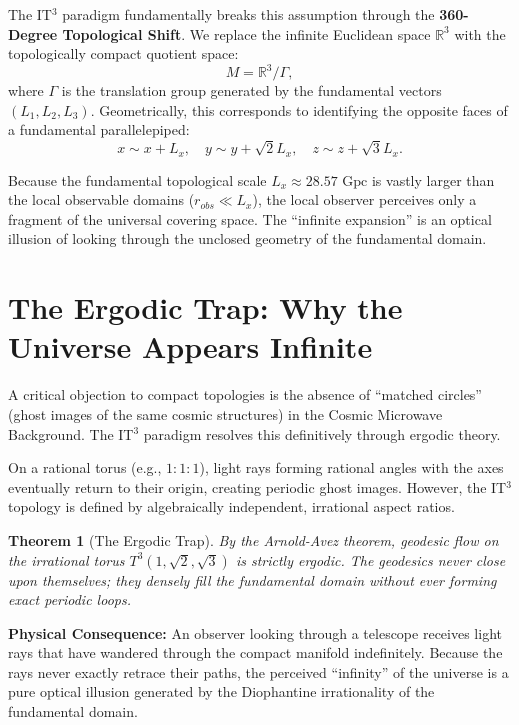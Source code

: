 \documentclass[12pt, a4paper]{article}
\newtheorem{theorem}{Theorem}
\begin{document}
The IT$^3$ paradigm fundamentally breaks this assumption through the \textbf{360-Degree Topological Shift}. We replace the infinite Euclidean space $\mathbb{R}^3$ with the topologically compact quotient space:
\begin{equation}
M = \mathbb{R}^3 / \Gamma,
\end{equation}
where $\Gamma$ is the translation group generated by the fundamental vectors $(L_1, L_2, L_3)$. Geometrically, this corresponds to identifying the opposite faces of a fundamental parallelepiped:
\begin{equation}
x \sim x + L_x, \quad y \sim y + \sqrt{2}L_x, \quad z \sim z + \sqrt{3}L_x.
\end{equation}

Because the fundamental topological scale $L_x \approx 28.57 \text{ Gpc}$ is vastly larger than the local observable domains ($r_{obs} \ll L_x$), the local observer perceives only a fragment of the universal covering space. The ``infinite expansion'' is an optical illusion of looking through the unclosed geometry of the fundamental domain.

\section{The Ergodic Trap: Why the Universe Appears Infinite}

A critical objection to compact topologies is the absence of ``matched circles'' (ghost images of the same cosmic structures) in the Cosmic Microwave Background. The IT$^3$ paradigm resolves this definitively through ergodic theory.

On a rational torus (e.g., $1:1:1$), light rays forming rational angles with the axes eventually return to their origin, creating periodic ghost images. However, the IT$^3$ topology is defined by algebraically independent, irrational aspect ratios.

\begin{theorem}[The Ergodic Trap]
By the Arnold-Avez theorem, geodesic flow on the irrational torus $T^3(1, \sqrt{2}, \sqrt{3})$ is strictly ergodic. The geodesics never close upon themselves; they densely fill the fundamental domain without ever forming exact periodic loops.
\end{theorem}

\textbf{Physical Consequence:} An observer looking through a telescope receives light rays that have wandered through the compact manifold indefinitely. Because the rays never exactly retrace their paths, the perceived ``infinity'' of the universe is a pure optical illusion generated by the Diophantine irrationality of the fundamental domain.
\end{document}
